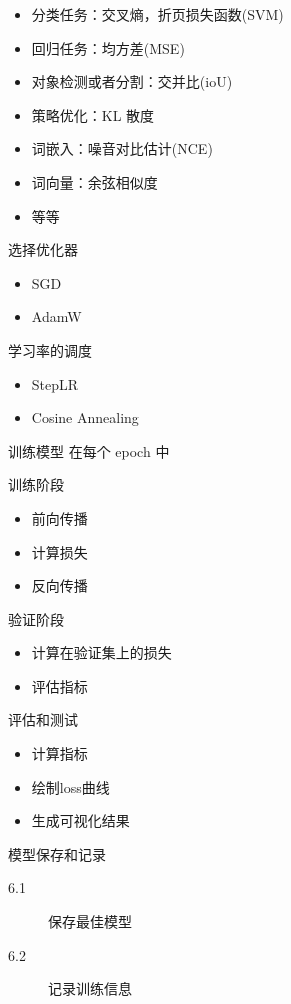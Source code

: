 \begin{description}
\begin{description}
\begin{itemize}
			\item 分类任务：交叉熵，折页损失函数(SVM)
			\item 回归任务：均方差(MSE)
			\item 对象检测或者分割：交并比(ioU)
			\item 策略优化：KL 散度
			\item 词嵌入：噪音对比估计(NCE)
			\item 词向量：余弦相似度
			\item 等等
		\end{itemize}
		\item[3.2] 选择优化器
		\begin{itemize}
			\item SGD
			\item AdamW
		\end{itemize}
		\item[3.3] 学习率的调度
		\begin{itemize}
			\item StepLR
			\item Cosine Annealing
		\end{itemize}
	\end{description}
	\item[4.] 训练模型
	在每个 epoch 中
	\begin{description}
		\item 训练阶段
		\begin{itemize}
			\item 前向传播
			\item 计算损失
			\item 反向传播
		\end{itemize}
		\item 验证阶段
		\begin{itemize}
			\item 计算在验证集上的损失
			\item 评估指标
		\end{itemize}
	\end{description}
	\item[5.] 评估和测试
	\begin{itemize}
		\item 计算指标
		\item 绘制loss曲线
		\item 生成可视化结果
	\end{itemize}
	\item[6.] 模型保存和记录
	\begin{description}
		\item[6.1] 保存最佳模型
		\item[6.2] 记录训练信息

\end{description}
\end{description}
